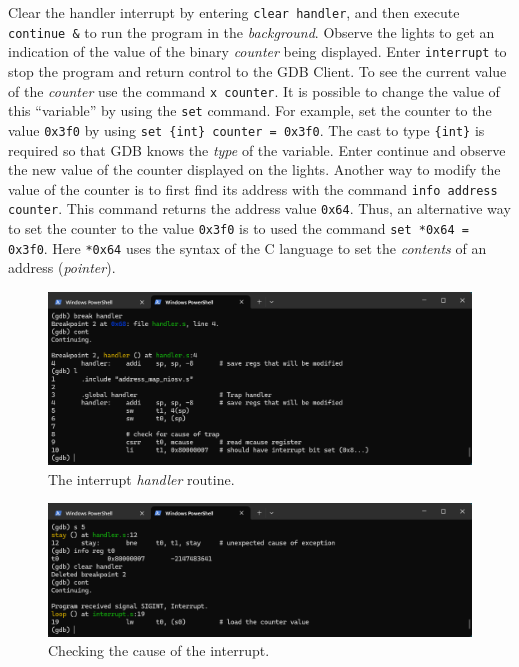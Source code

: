\documentclass[11pt, twoside, pdftex]{article}
\newcommand{\red}[1]{{\color{red}\sf{#1}}}
\begin{document}
Clear the handler interrupt by entering \texttt{clear handler}, and then execute
\texttt{continue \&} to run the program in the {\it background}. 
Observe the \red{{\it LEDR}} lights to get an indication of the
value of the binary {\it counter} being displayed. Enter \texttt{interrupt} to stop the
program and return control to the GDB Client. To see the current value of the {\it counter}
use the command \texttt{x counter}. It is possible to change the value of this ``variable'' 
by using the \texttt{set} command. For example, set the counter to the value \texttt{0x3f0} by
using \texttt{set \{int\} counter = 0x3f0}. The cast to type \texttt{\{int\}} is required so that 
GDB knows the {\it type} of the variable. Enter continue and observe the new value of
the counter displayed on the \red{{\it LEDR}} lights. Another way to modify the value of
the counter is to first find its address with the command \texttt{info address counter}.
This command returns the address value \texttt{0x64}. Thus, an alternative way to set the 
counter to the value \texttt{0x3f0} is to used the command
\texttt{set *0x64 = 0x3f0}. Here \texttt{*0x64}
uses the syntax of the C language to set the {\it contents} of an address ({\it pointer}). 

\begin{figure}[h]
    \begin{center}
        \includegraphics[scale=.6]{figures/interrupt_s4.png}
        \caption{The interrupt {\it handler} routine.}
        \label{fig:interrupt_s4}
    \end{center}
\end{figure}

\begin{figure}[h]
    \begin{center}
        \includegraphics[scale=.6]{figures/interrupt_s5.png}
        \caption{Checking the cause of the interrupt.}
        \label{fig:interrupt_s5}
    \end{center}
\end{figure}
\end{document}
